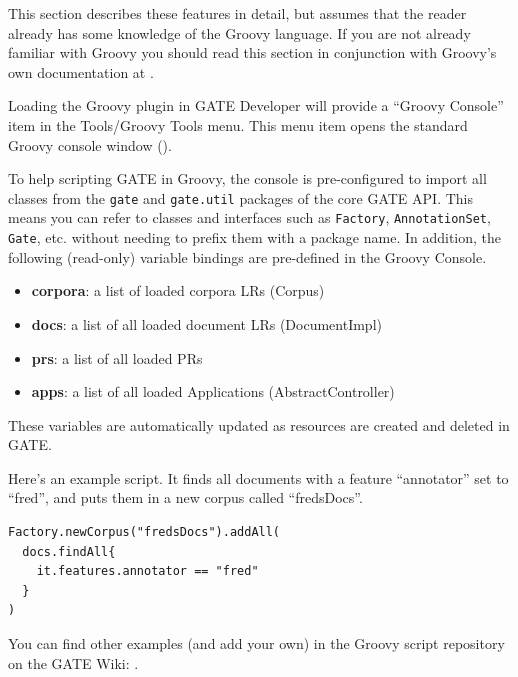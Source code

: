 This section describes these features in detail, but assumes that the reader
already has some knowledge of the Groovy language.  If you are not already
familiar with Groovy you should read this section in conjunction with Groovy's
own documentation at .


Loading the Groovy plugin in GATE Developer will provide a ``Groovy Console''
item in the Tools/Groovy Tools menu.  This menu item opens the standard Groovy
console window ().

To help scripting GATE in Groovy, the console is pre-configured to import all
classes from the \verb|gate| and \verb|gate.util| packages of the core GATE
API.  This means you can refer to
classes and interfaces such as \verb|Factory|, \verb|AnnotationSet|,
\verb|Gate|, etc. without needing to prefix them with a package name.
In addition, the following (read-only) variable bindings are pre-defined in the
Groovy Console.

\begin{itemize}
\item \textbf{corpora}: a list of loaded corpora LRs (Corpus)
\item \textbf{docs}: a list of all loaded document LRs (DocumentImpl)
\item \textbf{prs}: a list of all loaded PRs
\item \textbf{apps}: a list of all loaded Applications (AbstractController)
\end{itemize}

These variables are automatically updated as resources are created and deleted
in GATE.

Here's an example script. It finds all documents with a feature ``annotator''
set to ``fred'', and puts them in a new corpus called ``fredsDocs''.

\begin{lstlisting}
Factory.newCorpus("fredsDocs").addAll(
  docs.findAll{
    it.features.annotator == "fred"
  }
)
\end{lstlisting}

You can find other examples (and add your own) in the Groovy script repository
on the GATE Wiki: .

